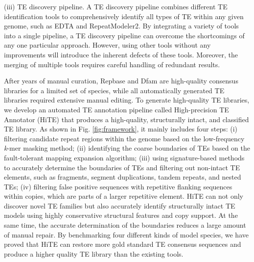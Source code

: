 \documentclass{bmcart}
\begin{document}
(iii) TE discovery pipeline. A TE discovery pipeline combines different TE identification tools to comprehensively identify all types of TE within any given genome, such as EDTA\cite{ou2019benchmarking} and RepeatModeler2\cite{flynn2020repeatmodeler2}. By integrating a variety of tools into a single pipeline, a TE discovery pipeline can overcome the shortcomings of any one particular approach. However, using other tools without any improvements will introduce the inherent defects of these tools. Moreover, the merging of multiple tools requires careful handling of redundant results.

After years of manual curation, Repbase\cite{bao2015repbase} and Dfam\cite{hubley2016dfam} are high-quality consensus libraries for a limited set of species, while all automatically generated TE libraries required extensive manual editing. To generate high-quality TE libraries, we develop an automated TE annotation pipeline called High-precision TE Annotator (HiTE) that produces a high-quality, structurally intact, and classified TE library. As shown in Fig. \ref{fig:framework}, it mainly includes four steps: (i) filtering candidate repeat regions within the genome based on the low-frequency \emph{k}-mer masking method; (ii) identifying the coarse boundaries of TEs based on the fault-tolerant mapping expansion algorithm; (iii) using signature-based methods to accurately determine the boundaries of TEs and filtering out non-intact TE elements, such as fragments, segment duplications, tandem repeats, and nested TEs; (iv) filtering false positive sequences with repetitive flanking sequences within copies, which are parts of a larger repetitive element. HiTE can not only discover novel TE families but also accurately identify structurally intact TE models using highly conservative structural features and copy support. At the same time, the accurate determination of the boundaries reduces a large amount of manual repair. By benchmarking four different kinds of model species, we have proved that HiTE can restore more gold standard TE consensus sequences and produce a higher quality TE library than the existing tools.
\end{document}
